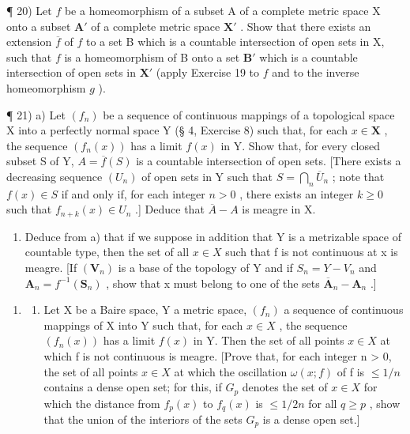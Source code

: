 ¶ 20) Let \(f\) be a homeomorphism of a subset A of a complete metric space X onto a subset \(\mathbf{A}'\) of a complete metric space \(\mathbf{X}'\) . Show that there exists an extension \(\overline{f}\) of \(f\) to a set B which is a countable intersection of open sets in X, such that \(f\) is a homeomorphism of B onto a set \(\mathbf{B}'\) which is a countable intersection of open sets in \(\mathbf{X}'\) (apply Exercise 19 to \(f\) and to the inverse homeomorphism \(g\) ).

¶ 21) a) Let \((f_n)\) be a sequence of continuous mappings of a topological space X into a perfectly normal space Y (§ 4, Exercise 8) such that, for each \(x \in \mathbf{X}\) , the sequence \((f_n(x))\) has a limit \(f(x)\) in Y. Show that, for every closed subset S of Y, \(A = \overline{f}(S)\) is a countable intersection of open sets. {[}There exists a decreasing sequence \((U_n)\) of open sets in Y such that \(S = \bigcap_{n} \overline{U}_n\) ; note that \(f(x) \in S\) if and only if, for each integer \(n > 0\) , there exists an integer \(k \geqslant 0\) such that \(f_{n+k}(x) \in U_n\) .{]} Deduce that \(\overline{A} - A\) is meagre in X.

\begin{enumerate}
\def\labelenumi{\alph{enumi})}
\setcounter{enumi}{1}
\tightlist
\item
  Deduce from a) that if we suppose in addition that Y is a metrizable space of countable type, then the set of all \(x \in X\) such that f is not continuous at x is meagre. {[}If \((\mathbf{V}_{n})\) is a base of the topology of Y and if \(S_{n} = Y - V_{n}\) and \(\mathbf{A}_{n} = f^{-1}(\mathbf{S}_{n})\) , show that x must belong to one of the sets \(\overline{\mathbf{A}}_{n} - \mathbf{A}_{n}\) .{]}
\end{enumerate}

\begin{enumerate}
\def\labelenumi{\arabic{enumi})}
\setcounter{enumi}{21}
\tightlist
\item
  \begin{enumerate}
  \def\labelenumii{\alph{enumii})}
  \tightlist
  \item
    Let X be a Baire space, Y a metric space, \((f_{n})\) a sequence of continuous mappings of X into Y such that, for each \(x \in X\) , the sequence \((f_{n}(x))\) has a limit \(f(x)\) in Y. Then the set of all points \(x \in X\) at which f is not continuous is meagre. {[}Prove that, for each integer n \textgreater{} 0, the set of all points \(x \in X\) at which the oscillation \(\omega(x; f)\) of f is \(\leqslant 1/n\) contains a dense open set; for this, if \(G_{p}\) denotes the set of \(x \in X\) for which the distance from \(f_{p}(x)\) to \(f_{q}(x)\) is \(\leqslant 1/2n\) for all \(q \geqslant p\) , show that the union of the interiors of the sets \(G_{p}\) is a dense open set.{]}
  \end{enumerate}
\end{enumerate}

